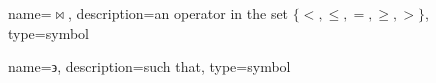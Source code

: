 	{%
		name=\ensuremath{\bowtie},
		description=an operator in the set \ensuremath{\{<, \leq, =, \geq, >\}},
		type=symbol
	}
	\newcommand{\relop}{\gls{sym:relop}}

	{%
		name={\ensuremath{\backepsilon}},
		description=such that,
		type=symbol
	}
	\newcommand{\suchthat}{\gls{sym:suchthat}}
